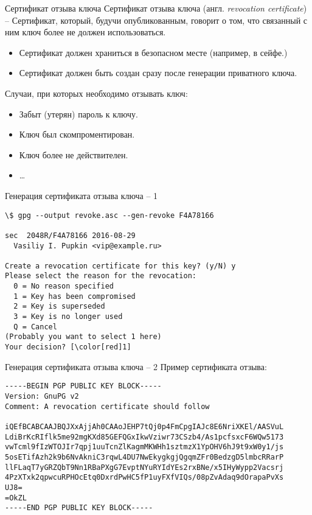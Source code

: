 \documentclass[presentation]{beamer}
\begin{document}
\begin{frame}[fragile]{Сертификат отзыва ключа}
  \raisebox{-.30em}{\Large\HandRight}\hspace{.25em} Сертификат отзыва
  ключа (англ. \emph{revocation certificate}) -- Сертификат, который,
  будучи опубликованным, говорит о том, что связанный с ним ключ более
  не должен использоваться.\newline

  \begin{itemize}
  \item Сертификат должен храниться в безопасном месте (например, в
    сейфе.)
  \item Сертификат должен быть создан сразу после генерации приватного
    ключа.\newline
  \end{itemize}
  
  Случаи, при которых необходимо отзывать ключ:
  \begin{itemize}
  \item Забыт (утерян) пароль к ключу.
  \item Ключ был скомпроментирован.
  \item Ключ более не действителен.
  \item \ldots{}
  \end{itemize}
\end{frame}

\begin{frame}[fragile]{Генерация сертификата отзыва ключа -- 1}
\begin{Verbatim}[commandchars=\\\[\]]
\$ gpg --output revoke.asc --gen-revoke F4A78166

sec  2048R/F4A78166 2016-08-29
  Vasiliy I. Pupkin <vip@example.ru>

Create a revocation certificate for this key? (y/N) y
Please select the reason for the revocation:
  0 = No reason specified
  1 = Key has been compromised
  2 = Key is superseded
  3 = Key is no longer used
  Q = Cancel
(Probably you want to select 1 here)
Your decision? [\color[red]1]
\end{Verbatim}
\end{frame}

\begin{frame}[fragile]{Генерация сертификата отзыва ключа -- 2}
  Пример сертификата отзыва:\newline
\footnotesize
\begin{Verbatim}[commandchars=\\\[\]]
-----BEGIN PGP PUBLIC KEY BLOCK-----
Version: GnuPG v2
Comment: A revocation certificate should follow

iQEfBCABCAAJBQJXxAjjAh0CAAoJEHP7tQj0p4FmCpgIAJc8E6NriXKEl/AASVuL
LdiBrKcRIflk5me92mgKXd85GEFQGxIkwVziwr73CSzb4/As1pcfsxcF6WQw5173
vwTcml9fIzWTOJIr7qpj1uuTcnZlKagmMKWHh1sztmzX1YpOHV6hJ9t9xW0y1/js
5osETifAzh2k9b6NvAkniC3rqwL4DU7NwEkygkgjQgqmZFr0BedzgD5lmbcRRarP
llFLaqT7yGRZQbT9Nn1RBaPXgG7EvptNYuRYIdYEs2rxBNe/x5IHyWypp2Vacsrj
4PzXTxk2qpwcuRPHOcEtq0DxrdPwHC5fP1uyFXfVIQs/08pZvAdaq9dOrapaPvXs
UJ8=
=OkZL
-----END PGP PUBLIC KEY BLOCK-----
\end{Verbatim}
\normalsize
\end{frame}
\end{document}

